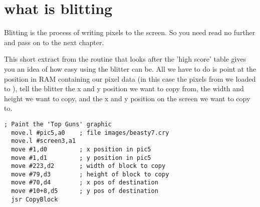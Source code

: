 \chapter{what is blitting} 
\label{sec:listing}
\lstset{style=6502Style}

Blitting is the process of writing pixels to the screen. So you need read no further and pass on to the next chapter.

This short extract from the routine that looks after the 'high score' table gives you an idea of how easy using the blitter
can be. All we have to do is point at the position in RAM containing our pixel data (in this case the pixels from 
we loaded to ), tell the blitter the x and y position we want to copy from, the width and height we want to copy, and
the x and y position on the screen we want to copy to.

\begin{lstlisting}[escapechar=\%]
  ; Paint the 'Top Guns' graphic
  move.l #pic5,a0    ; file images/beasty7.cry
  move.l #screen3,a1
  move #1,d0         ; x position in pic5
  move #1,d1         ; y position in pic5
  move #223,d2       ; width of block to copy
  move #79,d3        ; height of block to copy 
  move #70,d4        ; x pos of destination
  move #10+8,d5      ; y pos of destination
  jsr CopyBlock
\end{lstlisting}

